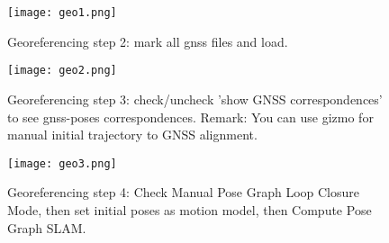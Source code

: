 \begin{figure}[H]
	\centering
	\texttt{[image: geo1.png]}
	\caption{Georeferencing step 2: mark all gnss files and load.}
	\label{fig:geo1}
\end{figure}

\begin{figure}[H]
	\centering
	\texttt{[image: geo2.png]}
	\caption{Georeferencing step 3: check/uncheck 'show GNSS correspondences' to see gnss-poses correspondences. Remark: You can use gizmo for manual initial trajectory to GNSS alignment.}
	\label{fig:geo2}
\end{figure}

\begin{figure}[H]
	\centering
	\texttt{[image: geo3.png]}
	\caption{Georeferencing step 4: Check Manual Pose Graph Loop Closure Mode, then set initial poses as motion model, then Compute Pose Graph SLAM.}
	\label{fig:geo3}
\end{figure}